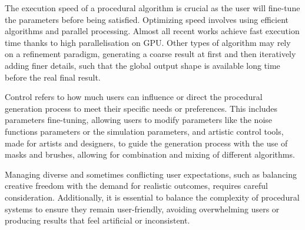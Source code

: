 The execution speed of a procedural algorithm is crucial as the user will fine-tune the parameters before being satisfied.
Optimizing speed involves using efficient algorithms and parallel processing. Almost all recent works achieve fast execution time thanks to high parallelisation on GPU. Other types of algorithm may rely on a refinement paradigm, generating a coarse result at first and then iteratively adding finer details, such that the global output shape is available long time before the real final result.

Control refers to how much users can influence or direct the procedural generation process to meet their specific needs or preferences. This includes parameters fine-tuning, allowing users to modify parameters like the noise functions parameters or the simulation parameters, and artistic control tools, made for artists and designers, to guide the generation process with the use of masks and brushes, allowing for combination and mixing of different algorithms.

Managing diverse and sometimes conflicting user expectations, such as balancing creative freedom with the demand for realistic outcomes, requires careful consideration. Additionally, it is essential to balance the complexity of procedural systems to ensure they remain user-friendly, avoiding overwhelming users or producing results that feel artificial or inconsistent.




